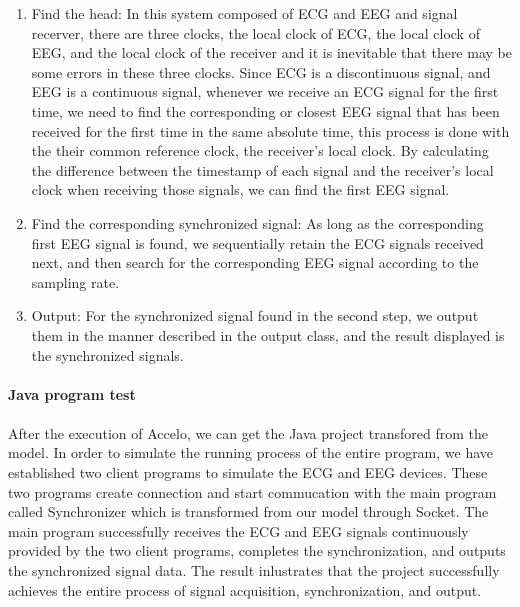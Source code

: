 \documentclass{article}
\begin{document}
\begin{enumerate}
    \item Find the head: In this system composed of ECG and EEG and signal recerver, there are three clocks, the local clock of ECG, the local clock of EEG, and the local clock of the receiver and it is inevitable that there may be some errors in these three clocks. Since ECG is a discontinuous signal, and EEG is a continuous signal, whenever we receive an ECG signal for the first time, we need to find the corresponding or closest EEG signal that has been received for the first time in the same absolute time, this process is done with the their common reference clock, the receiver’s local clock. By calculating the difference between the timestamp of each signal and the receiver’s local clock when receiving those signals, we can find the first EEG signal.
    \item Find the corresponding synchronized signal: As long as the corresponding first EEG signal is found, we sequentially retain the ECG signals received next, and then search for the corresponding EEG signal according to the sampling rate.
    \item Output: For the synchronized signal found in the second step, we output them in the manner described in the output class, and the result displayed is the synchronized signals.
\end{enumerate}

\paragraph{Java program test}

\paragraph{}

After the execution of Accelo, we can get the Java project transfored from the model. In order to simulate the running process of the entire program, we have established two client programs to simulate the ECG and EEG devices. These two programs create connection and start commucation with the main program called Synchronizer which is transformed from our model through Socket. The main program successfully receives the ECG and EEG signals continuously provided by the two client programs, completes the synchronization, and outputs the synchronized signal data. The result inlustrates that the project successfully achieves the entire process of signal acquisition, synchronization, and output.
\end{document}
